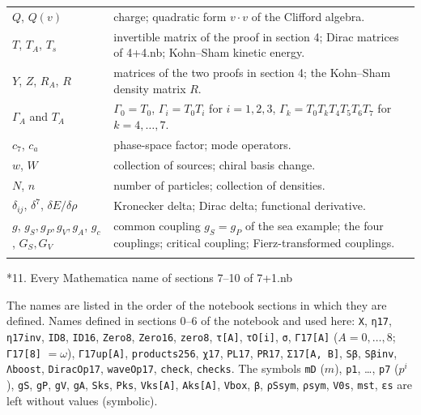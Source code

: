 \documentclass[10pt,a4paper]{article}
\makeatletter
\renewcommand\section{\@startsection{section}{1}{\z@}{-3.5ex \@plus -1ex \@minus -.2ex}{2.3ex \@plus.2ex}{\normalfont\Large\bfseries\raggedright}}
\makeatother
\begin{document}
{\begin{longtable}{>{\raggedright\arraybackslash}p{}>{\raggedright\arraybackslash}p{}}
$Q$, $Q(v)$ & charge; quadratic form $v\cdot v$ of the Clifford algebra. \\
$T$, $T_A$, $T_s$ & invertible matrix of the proof in section 4; Dirac matrices of 4+4.nb; Kohn–Sham kinetic energy. \\
$Y$, $Z$, $R_A$, $R$ & matrices of the two proofs in section 4; the Kohn–Sham density matrix $R$. \\
$\Gamma_A$ and $T_A$ & $\Gamma_0=T_0$, $\Gamma_i=T_0T_i$ for $i=1,2,3$, $\Gamma_k=T_0T_kT_4T_5T_6T_7$ for $k=4,\dots,7$. \\
$c_7$, $c_a$ & phase-space factor; mode operators. \\
$w$, $W$ & collection of sources; chiral basis change. \\
$N$, $n$ & number of particles; collection of densities. \\
$\delta_{ij}$, $\delta^7$, $\delta E/\delta\rho$ & Kronecker delta; Dirac delta; functional derivative. \\
$g$, $g_S,g_P,g_V,g_A$, $g_c$, $G_S,G_V$ & common coupling $g_S=g_P$ of the sea example; the four couplings; critical coupling; Fierz-transformed couplings. \\*
\end{longtable}}
\section*{11. Every Mathematica name of sections 7–10 of 7+1.nb}
The names are listed in the order of the notebook sections in which they are defined. Names defined in sections 0–6 of the notebook and used here: \texttt{X}, \texttt{η17}, \texttt{η17inv}, \texttt{ID8}, \texttt{ID16}, \texttt{Zero8}, \texttt{Zero16}, \texttt{zero8}, \texttt{τ[A]}, \texttt{τO[i]}, \texttt{σ}, \texttt{Γ17[A]} ($A=0,\dots,8$; \texttt{Γ17[8]} $=\omega$), \texttt{Γ17up[A]}, \texttt{products256}, \texttt{χ17}, \texttt{PL17}, \texttt{PR17}, \texttt{Σ17[A, B]}, \texttt{Sβ}, \texttt{Sβinv}, \texttt{Λboost}, \texttt{DiracOp17}, \texttt{waveOp17}, \texttt{check}, \texttt{checks}. The symbols \texttt{mD} ($m$), \texttt{p1}, …, \texttt{p7} ($p^i$), \texttt{gS}, \texttt{gP}, \texttt{gV}, \texttt{gA}, \texttt{Sks}, \texttt{Pks}, \texttt{Vks[A]}, \texttt{Aks[A]}, \texttt{Vbox}, \texttt{β}, \texttt{ρSsym}, \texttt{ρsym}, \texttt{V0s}, \texttt{mst}, \texttt{εs} are left without values (symbolic).
\end{document}
